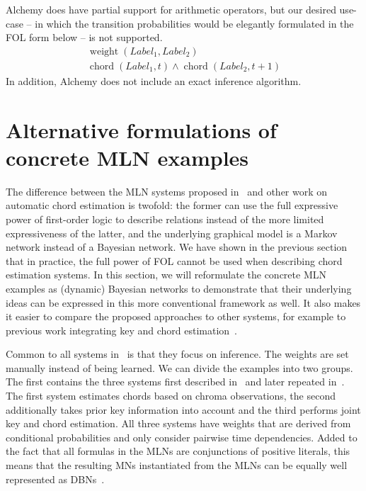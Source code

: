 \documentclass[letterpaper]{article} %
\begin{document}
Alchemy does have partial support for arithmetic operators, but our desired use-case -- in which the transition probabilities would be elegantly formulated in the FOL form below -- is not supported.
\begin{multline}
\operatorname{weight}\left(Label_1,Label_2\right) \\ \operatorname{chord}\left(Label_1, t\right) \wedge \operatorname{chord}\left(Label_2, t+1\right)
\end{multline}
In addition, Alchemy does not include an exact inference algorithm.


\section{Alternative formulations of concrete MLN examples}

The difference between the MLN systems proposed in~\cite{papadopoulos2012ismir,papadopoulos2013icassp,papadopoulos2017taslp} and other work on automatic chord estimation is twofold: the former can use the full expressive power of first-order logic to describe relations instead of the more limited expressiveness of the latter, and the underlying graphical model is a Markov network instead of a Bayesian network. We have shown in the previous section that in practice, the full power of FOL cannot be used when describing chord estimation systems. In this section, we will reformulate the concrete MLN examples as (dynamic) Bayesian networks to demonstrate that their underlying ideas can be expressed in this more conventional framework as well. It also makes it easier to compare the proposed approaches to other systems, for example to previous work integrating key and chord estimation~\cite{mauch2010taslp,pauwels2014jnmr}.

Common to all systems in~\cite{papadopoulos2012ismir,papadopoulos2013icassp,papadopoulos2017taslp} is that they focus on inference. The weights are set manually instead of being learned. We can divide the examples into two groups. The first contains the three systems first described in~\cite{papadopoulos2012ismir} and later repeated in~\cite{papadopoulos2017taslp}. The first system estimates chords based on chroma observations, the second additionally takes prior key information into account and the third performs joint key and chord estimation. All three systems have weights that are derived from conditional probabilities and only consider pairwise time dependencies. Added to the fact that all formulas in the MLNs are conjunctions of positive literals, this means that the resulting MNs instantiated from the MLNs can be equally well represented as DBNs~\cite{sang2005aaai}.
\end{document}
